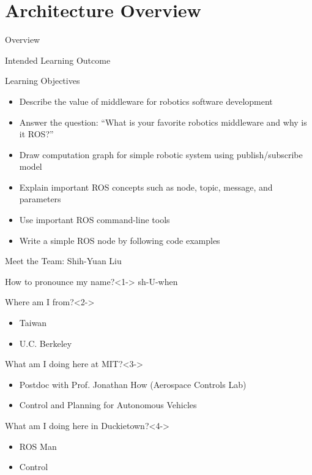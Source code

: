 \documentclass[aspectratio=43]{beamer}
\begin{document}
\section{Architecture Overview}
\begin{frame}[label=overview]{Overview}
	\tableofcontents[sectionstyle=show/shaded,subsectionstyle=show/shaded/shaded]
\end{frame}

\begin{frame}{Intended Learning Outcome}
	\begin{block}{Learning Objectives}
		\begin{itemize}
			\item<0> Describe the value of middleware for robotics software development
			\item<0> Answer the question: ``What is your favorite robotics middleware and why is it ROS?''
			\item<1> Draw computation graph for simple robotic system using publish/subscribe model
			\item<1> Explain important ROS concepts such as node, topic, message, and parameters
			\item<1> Use important ROS command-line tools
			\item<0> Write a simple ROS node by following code examples
		\end{itemize}
	\end{block}
\end{frame}

\begin{frame}{Meet the Team: Shih-Yuan Liu}
	\begin{block}{How to pronounce my name?}<1->
		sh-U-when
	\end{block}
	\begin{block}{Where am I from?}<2->
		\begin{itemize}
			\item Taiwan
			\item U.C. Berkeley
		\end{itemize}
	\end{block}
	\begin{block}{What am I doing here at MIT?}<3->
		\begin{itemize}
			\item Postdoc with Prof. Jonathan How (Aerospace Controls Lab)
			\item Control and Planning for Autonomous Vehicles
		\end{itemize}
	\end{block}
	\begin{block}{What am I doing here in Duckietown?}<4->
		\begin{itemize}
			\item ROS Man
			\item Control
		\end{itemize}
	\end{block}
\end{frame}
\end{document}
